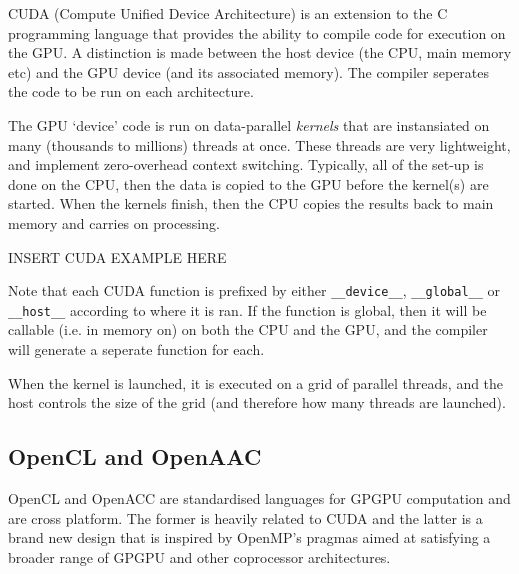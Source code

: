 CUDA (Compute Unified Device Architecture) is an extension to the C
programming language that provides the ability to compile code for
execution on the GPU. A distinction is made between the host device
(the CPU, main memory etc) and the GPU device (and its associated
memory). The compiler seperates the code to be run on each
architecture.

The GPU `device' code is run on data-parallel \textit{kernels} that
are instansiated on many (thousands to millions) threads at
once. These threads are very lightweight, and implement zero-overhead
context switching. Typically, all of the set-up is done on the CPU,
then the data is copied to the GPU before the kernel(s) are
started. When the kernels finish, then the CPU copies the results back
to main memory and carries on processing.

INSERT CUDA EXAMPLE HERE

Note that each CUDA function is prefixed by
either \texttt{\_\_device\_\_}, \texttt{\_\_global\_\_}
or \texttt{\_\_host\_\_} according to where it is ran. If the function
is global, then it will be callable (i.e. in memory on) on both the
CPU and the GPU, and the compiler will generate a seperate function
for each.

When the kernel is launched, it is executed on a grid of parallel
threads, and the host controls the size of the grid (and therefore how
many threads are launched).


\subsection{OpenCL and OpenAAC}

OpenCL and OpenACC are standardised languages for GPGPU computation
and are cross platform. The former is heavily related to CUDA and the
latter is a brand new design that is inspired by OpenMP's pragmas
aimed at satisfying a broader range of GPGPU and other coprocessor
architectures.



{}

